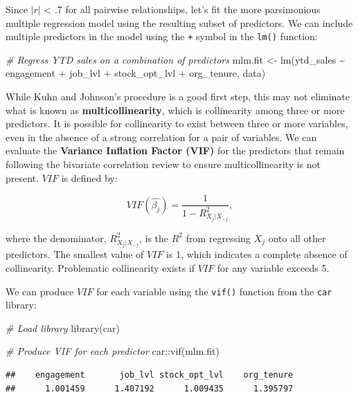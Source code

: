 \documentclass[
]{book}
\newenvironment{Shaded}{\begin{snugshade}}{\end{snugshade}}
\newcommand{\CommentTok}[1]{\textcolor[rgb]{0.56,0.35,0.01}{\textit{#1}}}
\newcommand{\FunctionTok}[1]{\textcolor[rgb]{0.00,0.00,0.00}{#1}}
\newcommand{\NormalTok}[1]{#1}
\newcommand{\OtherTok}[1]{\textcolor[rgb]{0.56,0.35,0.01}{#1}}
\newcommand{\SpecialCharTok}[1]{\textcolor[rgb]{0.00,0.00,0.00}{#1}}
\begin{document}
Since \(|r|\) \textless{} .7 for all pairwise relationships, let's fit the more parsimonious multiple regression model using the resulting subset of predictors. We can include multiple predictors in the model using the \texttt{+} symbol in the \texttt{lm()} function:

\begin{Shaded}
\begin{Highlighting}[]
\CommentTok{\# Regress YTD sales on a combination of predictors}
\NormalTok{mlm.fit }\OtherTok{\textless{}{-}} \FunctionTok{lm}\NormalTok{(ytd\_sales }\SpecialCharTok{\textasciitilde{}}\NormalTok{ engagement }\SpecialCharTok{+}\NormalTok{ job\_lvl }\SpecialCharTok{+}\NormalTok{ stock\_opt\_lvl }\SpecialCharTok{+}\NormalTok{ org\_tenure, data)}
\end{Highlighting}
\end{Shaded}

While Kuhn and Johnson's procedure is a good first step, this may not eliminate what is known as \textbf{multicollinearity}, which is collinearity among three or more predictors. It is possible for collinearity to exist between three or more variables, even in the absence of a strong correlation for a pair of variables. We can evaluate the \textbf{Variance Inflation Factor (VIF)} for the predictors that remain following the bivariate correlation review to ensure multicollinearity is not present. \(VIF\) is defined by:

\[ VIF(\hat{\beta_j}) = \frac{1}{1 - R^2_{X_j|X_{-j}}}, \]

where the denominator, \(R^2_{X_j|X_{-j}}\), is the \(R^2\) from regressing \(X_j\) onto all other predictors. The smallest value of \(VIF\) is 1, which indicates a complete absence of collinearity. Problematic collinearity exists if \(VIF\) for any variable exceeds 5.

We can produce \(VIF\) for each variable using the \texttt{vif()} function from the \texttt{car} library:

\begin{Shaded}
\begin{Highlighting}[]
\CommentTok{\# Load library}
\FunctionTok{library}\NormalTok{(car)}

\CommentTok{\# Produce VIF for each predictor}
\NormalTok{car}\SpecialCharTok{::}\FunctionTok{vif}\NormalTok{(mlm.fit)}
\end{Highlighting}
\end{Shaded}

\begin{verbatim}
##    engagement       job_lvl stock_opt_lvl    org_tenure 
##      1.001459      1.407192      1.009435      1.395797
\end{verbatim}
\end{document}
